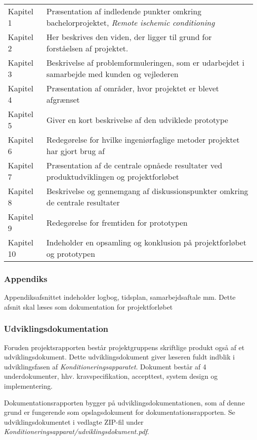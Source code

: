 	\begin{longtable}{ p{} p{} } 
		Kapitel 1 & Præsentation af indledende punkter omkring bachelorprojektet, \textit{Remote ischemic conditioning}\\
		Kapitel 2 & Her beskrives den viden, der ligger til grund for forståelsen af projektet. \\
		Kapitel 3 & Beskrivelse af problemformuleringen, som er udarbejdet i samarbejde med kunden og vejlederen\\
		Kapitel 4 & Præsentation af områder, hvor projektet er blevet afgrænset\\
		Kapitel 5 & Giver en kort beskrivelse af den udviklede prototype\\
		Kapitel 6 & Redegørelse for hvilke ingeniørfaglige metoder projektet har gjort brug af \\
		Kapitel 7 & Præsentation af de centrale opnåede resultater ved produktudviklingen og projektforløbet\\
		Kapitel 8 & Beskrivelse og gennemgang af diskussionspunkter omkring de centrale resultater\\
		Kapitel 9 & Redegørelse for fremtiden for prototypen\\ 
		Kapitel 10& Indeholder en opsamling og konklusion på projektforløbet og prototypen\\
	\end{longtable}

\subsubsection{Appendiks}
Appendiksafsnittet indeholder logbog, tidsplan, samarbejdsaftale mm. Dette afsnit skal læses som dokumentation for projektforløbet

\subsubsection{Udviklingsdokumentation}
Foruden projektsrapporten består projektgruppens skriftlige produkt også af et udviklingsdokument. Dette udviklingsdokument giver læseren fuldt indblik i udviklingsfasen af \textit{Konditioneringsapparatet}. Dokument består af 4 underdokumenter, hhv. kravspecifikation, accepttest, system design og implementering. 

Dokumentationsrapporten bygger på udviklingsdokumentationen, som af denne grund er fungerende som opslagsdokument for dokumentationsrapporten. Se udviklingsdokumentet i vedlagte ZIP-fil under \textit{Konditioneringsapparat/udviklingsdokument.pdf}.



